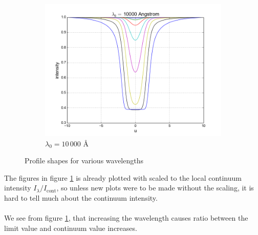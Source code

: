 \documentclass{article}
\begin{document}
\begin{figure}[H]
\begin{subfigure}[b]{0.49\textwidth}
    \includegraphics[width=\textwidth]{ssa_3_3_wave_3.png}
    \caption{$\lambda_0 = 10\,000$ Å}
  \end{subfigure}
  \caption{Profile shapes for various wavelengths}
  \label{fig:wave}
\end{figure}
The figures in figure \ref{fig:wave} is already plotted with scaled to the local continuum intensity $I_{\lambda}/I_{\text{cont}}$, so unless new plots were to be made without the scaling, it is hard to tell much about the continuum intensity.\\\\
We see from figure \ref{fig:wave}, that increasing the wavelength causes ratio between the limit value and continuum value increases.
\end{document}

